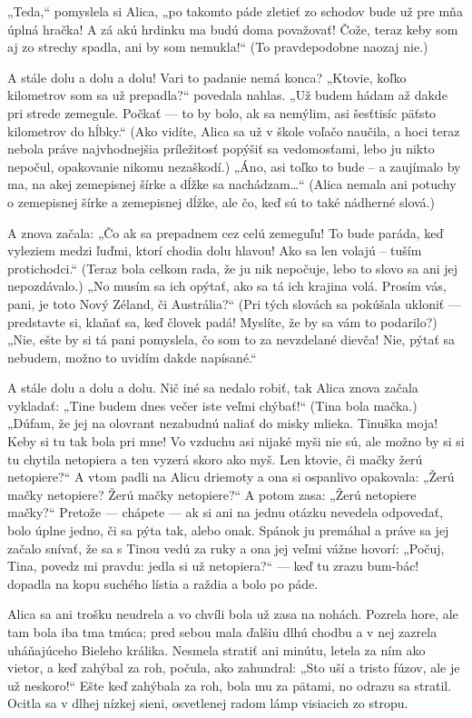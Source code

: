 \documentclass[12pt]{article}
\begin{document}
\begin{Parallel}[p]{}{}
{„Teda,“ pomyslela si Alica, „po takomto páde zletieť zo schodov bude už pre mňa úplná hračka! A zá akú hrdinku ma budú doma považovať! Čože, teraz keby som aj zo strechy spadla, ani by som nemukla!“ (To pravdepodobne naozaj nie.)

A stále dolu a dolu a dolu! Vari to padanie nemá konca? „Ktovie, koľko kilometrov som sa už prepadla?“ povedala nahlas. „Už budem hádam až dakde pri strede zemegule. Počkať — to by bolo, ak sa nemýlim, asi šesťtisíc päťsto kilometrov do hĺbky.“ (Ako vidíte, Alica sa už v škole voľačo naučila, a hoci teraz nebola práve najvhodnejšia príležitosť popýšiť sa vedomosťami, lebo ju nikto nepočul, opakovanie nikomu nezaškodí.) „Áno, asi toľko to bude – a zaujímalo by ma, na akej zemepisnej šírke a dĺžke sa nachádzam…“ (Alica nemala ani potuchy o zemepisnej
šírke a zemepisnej dĺžke, ale čo, keď sú to také nádherné slová.)

A znova začala: „Čo ak sa prepadnem cez celú zemeguľu! To bude paráda, keď vyleziem medzi ľuďmi, ktorí chodia dolu hlavou! Ako sa len volajú – tuším protichodci.“ (Teraz bola celkom rada, že ju nik nepočuje, lebo to slovo sa ani jej nepozdávalo.) „No musím sa ich opýtať, ako sa tá ich krajina volá. Prosím vás, pani, je toto Nový Zéland, či Austrália?“ (Pri tých slovách sa pokúšala ukloniť — predstavte si, klaňať sa, keď človek padá! Myslíte, že by sa vám to podarilo?) „Nie, ešte by si tá pani pomyslela, čo som to za nevzdelané dievča! Nie, pýtať sa nebudem, možno to uvidím dakde napísané.“

A stále dolu a dolu a dolu. Nič iné sa nedalo robiť, tak Alica znova začala vykladať: „Tine budem dnes večer iste veľmi chýbať!“ (Tina bola mačka.) „Dúfam, že jej na olovrant nezabudnú naliať do misky mlieka. Tinuška moja! Keby si tu tak bola pri mne! Vo vzduchu asi nijaké myši nie sú, ale možno by si si tu chytila netopiera a ten vyzerá skoro ako myš. Len ktovie, či mačky žerú netopiere?“ A vtom padli na Alicu driemoty a ona si ospanlivo opakovala: „Žerú mačky netopiere? Žerú mačky netopiere?“ A potom zasa: „Žerú netopiere mačky?“ Pretože — chápete — ak si ani na jednu otázku nevedela odpovedať, bolo úplne jedno, či sa pýta tak, alebo onak. Spánok ju premáhal a práve sa jej
začalo snívať, že sa s Tinou vedú za ruky a ona jej veľmi vážne hovorí: „Počuj, Tina, povedz mi pravdu: jedla si už
netopiera?“ — keď tu zrazu bum-bác! dopadla na kopu suchého lístia a raždia a bolo po páde.

Alica sa ani trošku neudrela a vo chvíli bola už zasa na nohách. Pozrela hore, ale tam bola iba tma tmúca; pred sebou mala ďalšiu dlhú chodbu a v nej zazrela uháňajúceho Bieleho králika. Nesmela stratiť ani minútu, letela za ním ako vietor, a keď zahýbal za roh, počula, ako zahundral: „Sto uší a tristo fúzov, ale je už neskoro!“ Ešte keď zahýbala za roh, bola mu za pätami, no odrazu sa stratil. Ocitla sa v dlhej nízkej sieni, osvetlenej radom lámp visiacich zo stropu.

}
\end{Parallel}
\end{document}
